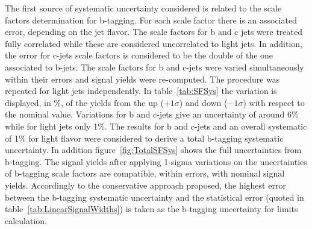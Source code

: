 The first source of systematic uncertainty considered is related to the scale factors determination for b-tagging. For each scale factor there is an associated error, depending on the jet flavor. The scale factors for b and c jets were treated fully correlated while these are considered uncorrelated to light jets. In addition, the error for c-jets scale factors is considered to be the double of the one associated to b-jets. The scale factors for b and c-jets were varied simultaneously within their errors and signal yields were re-computed. The procedure was repeated for light jets independently. In table~\ref{tab:SFSys} the variation is displayed, in \%, of the yields from the up ($+1\sigma$) and down ($-1\sigma$) with respect to the nominal value. Variations for b and c-jets give an uncertainty of around 6\% while for light jets only 1\%. The results for b and c-jets and an overall systematic of 1\% for light flavor were considered to derive a total b-tagging systematic uncertainty. In addition figure~\ref{fig:TotalSFSys} shows the full uncertainties from b-tagging. The signal yields after applying 1-sigma variations on the uncertainties of b-tagging scale factors are compatible, within errors, with nominal signal yields. Accordingly to the conservative approach proposed, the highest error between the b-tagging systematic uncertainty and the statistical error (quoted in table~\ref{tab:LinearSignalWidths}) is taken as the b-tagging uncertainty for limits calculation.

\begin{table*}[htbH]
\begin{center}
\caption{B-tagging uncertainties for signal yields.\label{tab:SFSys}}
\end{center}
\end{table*}

